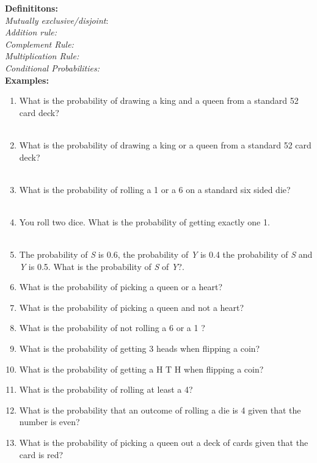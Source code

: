 \documentclass[12pt]{article}
\begin{document}
 \clearpage
 
\textbf{Definititons:}\\

\textit{Mutually exclusive/disjoint}:\\
\textit{Addition rule:}\\
\textit{Complement Rule:}\\
\textit{Multiplication Rule:}\\
\textit{Conditional Probabilities:}\\

\textbf{Examples:}\\

\begin{enumerate}
\item What is the probability of drawing a king and a queen from a standard 52 card deck?\\
\\
\item What is the probability of drawing a king or a queen from a standard 52 card deck?\\ 
\\
\item What is the probability of rolling a 1 or a 6 on a standard six sided die?\\
\\
\item You roll two dice. What is the probability of getting exactly one 1. \\
\\
\item The probability of \textit{S} is 0.6, the probability of \textit{Y} is 0.4 the probability of \textit{S} and \textit{Y} is 0.5. What is the probability of \textit{S} of \textit{Y}?. \\  

\item What is the probability of picking a queen or a heart?\\

\item What is the probability of picking a queen and not a heart?\\

\item What is the probability of not rolling a 6 or a 1 ? 

\item What is the probability of getting 3 heads when flipping a coin?\\

\item What is the probability of getting a H T H when flipping a coin? \\

\item What is the probability of rolling at least a 4?\\

\item What is the probability that an outcome of rolling a die is 4 given that the number is even?\\

\item What is the probability of picking a queen out a deck of cards given that the card is red?\\


\end{enumerate}
\end{document}
